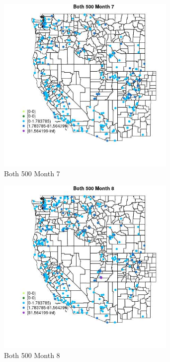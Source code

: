 \begin{figure} 
\centering  
\includegraphics[width=0.77\textwidth]{Code_Outputs/Report_ML_input_PM25_Step4_part_e_de_duplicated_aveswNAs_MapObsMo7Both_500.jpg} 
\caption{\label{fig:Report_ML_input_PM25_Step4_part_e_de_duplicated_aveswNAsMapObsMo7Both_500}Both 500 Month 7} 
\end{figure} 
 

\begin{figure} 
\centering  
\includegraphics[width=0.77\textwidth]{Code_Outputs/Report_ML_input_PM25_Step4_part_e_de_duplicated_aveswNAs_MapObsMo8Both_500.jpg} 
\caption{\label{fig:Report_ML_input_PM25_Step4_part_e_de_duplicated_aveswNAsMapObsMo8Both_500}Both 500 Month 8} 
\end{figure} 
 

